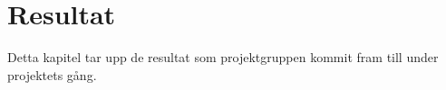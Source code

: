 \chapter{Resultat}
\label{cha:results}

Detta kapitel tar upp de resultat som projektgruppen kommit fram till under projektets gång.





